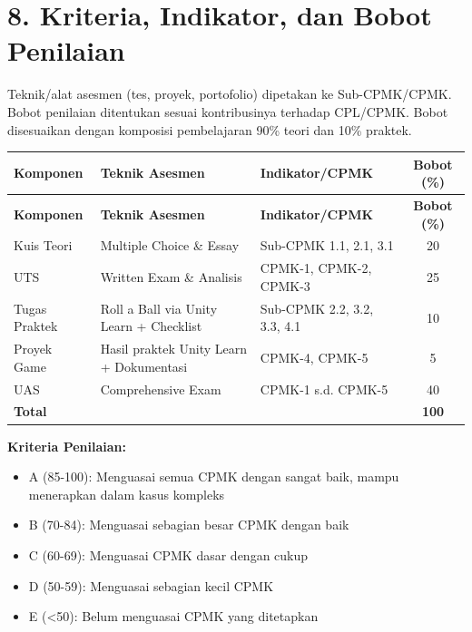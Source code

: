 \documentclass[12pt,a4paper]{article}
\begin{document}
\vspace{0.5cm}

\section*{8. Kriteria, Indikator, dan Bobot Penilaian}

Teknik/alat asesmen (tes, proyek, portofolio) dipetakan ke Sub-CPMK/CPMK. Bobot penilaian ditentukan sesuai kontribusinya terhadap CPL/CPMK. Bobot disesuaikan dengan komposisi pembelajaran 90\% teori dan 10\% praktek.

\begin{longtable}{|>{\raggedright\arraybackslash}p{2.5cm}|>{\raggedright\arraybackslash}p{4cm}|>{\raggedright\arraybackslash}p{5.5cm}|c|}
\hline
\textbf{Komponen} & \textbf{Teknik Asesmen} & \textbf{Indikator/CPMK} & \textbf{Bobot (\%)} \\
\hline
\endfirsthead
\hline
\textbf{Komponen} & \textbf{Teknik Asesmen} & \textbf{Indikator/CPMK} & \textbf{Bobot (\%)} \\
\hline
\endhead
\hline
\endfoot

Kuis Teori & Multiple Choice \& Essay & Sub-CPMK 1.1, 2.1, 3.1 & 20 \\
\hline
UTS & Written Exam \& Analisis & CPMK-1, CPMK-2, CPMK-3 & 25 \\
\hline
Tugas Praktek & Roll a Ball via Unity Learn + Checklist & Sub-CPMK 2.2, 3.2, 3.3, 4.1 & 10 \\
\hline
Proyek Game & Hasil praktek Unity Learn + Dokumentasi & CPMK-4, CPMK-5 & 5 \\
\hline
UAS & Comprehensive Exam & CPMK-1 s.d. CPMK-5 & 40 \\
\hline
\textbf{Total} & & & \textbf{100} \\
\hline
\end{longtable}

\textbf{Kriteria Penilaian:}
\begin{itemize}[leftmargin=*]
  \item A (85-100): Menguasai semua CPMK dengan sangat baik, mampu menerapkan dalam kasus kompleks
  \item B (70-84): Menguasai sebagian besar CPMK dengan baik
  \item C (60-69): Menguasai CPMK dasar dengan cukup
  \item D (50-59): Menguasai sebagian kecil CPMK
  \item E (<50): Belum menguasai CPMK yang ditetapkan
\end{itemize}
\end{document}
